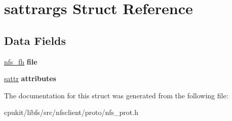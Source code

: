 \hypertarget{structsattrargs}{}\section{sattrargs Struct Reference}
\label{structsattrargs}
\subsection*{Data Fields}
\begin{DoxyCompactItemize}
\item 
\mbox{\label{structsattrargs_ac3a6c0712cc140bd841fc01d62ad0b76}} 
\mbox{\hyperlink{structnfs__fh}{nfs\+\_\+fh}} {\bfseries file}
\item 
\mbox{\label{structsattrargs_a2aadf03ca46199c239a5d62dcad0b2a2}} 
\mbox{\hyperlink{structsattr}{sattr}} {\bfseries attributes}
\end{DoxyCompactItemize}


The documentation for this struct was generated from the following file\+:\begin{DoxyCompactItemize}
\item 
cpukit/libfs/src/nfsclient/proto/nfs\+\_\+prot.\+h\end{DoxyCompactItemize}
